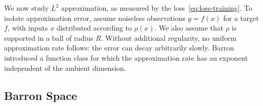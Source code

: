 We now study $L^2$ approximation, as measured by the loss~\eqref{eq:loss-training}. To isolate approximation error, assume noiseless observations $y=f(x)$ for a target $f$, with inputs $x$ distributed according to $\rho(x)$. We also assume that $\rho$ is supported in a ball of radius $R$.
%
Without additional regularity, no uniform approximation rate follows: the error can decay arbitrarily slowly. Barron introduced a function class for which the approximation rate has an exponent independent of the ambient dimension.

\subsection{Barron Space}

